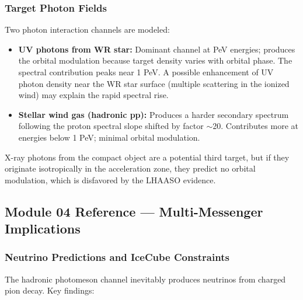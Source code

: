 \documentclass[11pt,letterpaper]{article}
\begin{document}
\subsubsection{Target Photon Fields}

Two photon interaction channels are modeled:
\begin{itemize}
  \item \textbf{UV photons from WR star:} Dominant channel at PeV energies; produces the orbital modulation because target density varies with orbital phase. The spectral contribution peaks near 1 PeV. A possible enhancement of UV photon density near the WR star surface (multiple scattering in the ionized wind) may explain the rapid spectral rise.
  \item \textbf{Stellar wind gas (hadronic pp):} Produces a harder secondary spectrum following the proton spectral slope shifted by factor $\sim$20. Contributes more at energies below 1 PeV; minimal orbital modulation.
\end{itemize}

X-ray photons from the compact object are a potential third target, but if they originate isotropically in the acceleration zone, they predict no orbital modulation, which is disfavored by the LHAASO evidence.

\subsection{Module 04 Reference --- Multi-Messenger Implications}

\subsubsection{Neutrino Predictions and IceCube Constraints}

The hadronic photomeson channel inevitably produces neutrinos from charged pion decay. Key findings:
\end{document}
